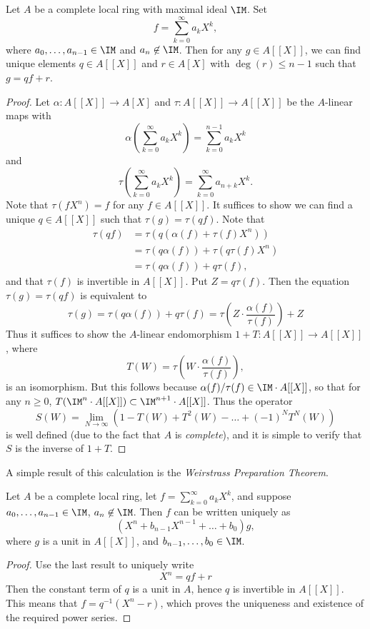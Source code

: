 \begin{theorem}
    Let $A$ be a complete local ring with maximal ideal $\IM$. Set
    \[ f = \sum_{k = 0}^\infty a_k X^k, \]
    where $a_0,\dots, a_{n-1} \in \IM$ and $a_n \not \in \IM$. Then for any $g \in A[[X]]$, we can find unique elements $q \in A[[X]]$ and $r \in A[X]$ with $\deg(r) \leq n-1$ such that $g = qf + r$.
\end{theorem}
\begin{proof}
    Let $\alpha: A[[X]] \to A[X]$ and $\tau: A[[X]] \to A[[X]]$ be the $A$-linear maps with
    \[ \alpha \left( \sum_{k = 0}^\infty a_k X^k \right) = \sum_{k = 0}^{n-1} a_k X^k \]
    and
    \[ \tau \left( \sum_{k = 0}^\infty a_k X^k \right) = \sum_{k = 0}^\infty a_{n+k} X^k. \]
    Note that $\tau(f X^n) = f$ for any $f \in A[[X]]$. It suffices to show we can find a unique $q \in A[[X]]$ such that $\tau(g) = \tau(qf)$. Note that
    \begin{align*}
        \tau(qf) &= \tau(q(\alpha(f) + \tau(f) X^n))\\
        &= \tau(q \alpha(f)) + \tau(q \tau(f) X^n)\\
        &= \tau(q \alpha(f)) + q \tau(f),
    \end{align*}
    and that $\tau(f)$ is invertible in $A[[X]]$. Put $Z = q \tau(f)$. Then the equation $\tau(g) = \tau(qf)$ is equivalent to
    \[ \tau(g) = \tau(q \alpha(f)) + q \tau(f) = \tau \left( Z \cdot \frac{\alpha(f)}{\tau(f)} \right) + Z \]
    Thus it suffices to show the $A$-linear endomorphism $1 + T:A[[X]] \to A[[X]]$, where
    \[ T(W) = \tau \left( W \cdot \frac{\alpha(f)}{\tau(f)} \right), \]
    is an isomorphism. But this follows because $\alpha(f)/\tau(f) \in \IM \cdot A[[X]]$, so that for any $n \geq 0$, $T(\IM^n \cdot A[[X]]) \subset \IM^{n+1} \cdot A[[X]]$. Thus the operator
    \[ S(W) = \lim_{N \to \infty} \left( 1 - T(W) + T^2(W) - \dots + (-1)^N T^N(W) \right) \]
    is well defined (due to the fact that $A$ is \emph{complete}), and it is simple to verify that $S$ is the inverse of $1 + T$.
\end{proof}

A simple result of this calculation is the \emph{Weirstrass Preparation Theorem}.

\begin{theorem}
    Let $A$ be a complete local ring, let $f = \sum_{k = 0}^\infty a_k X^k$, and suppose $a_0,\dots,a_{n-1} \in \IM$, $a_n \not \in \IM$. Then $f$ can be written uniquely as
    \[ (X^n + b_{n-1}X^{n-1} + \dots + b_0) g, \]
    where $g$ is a unit in $A[[X]]$, and $b_{n-1},\dots, b_0 \in \IM$.
\end{theorem}
\begin{proof}
    Use the last result to uniquely write
    \[ X^n = qf + r \]
    Then the constant term of $q$ is a unit in $A$, hence $q$ is invertible in $A[[X]]$. This means that $f = q^{-1} (X^n - r)$, which proves the uniqueness and existence of the required power series.
\end{proof}

